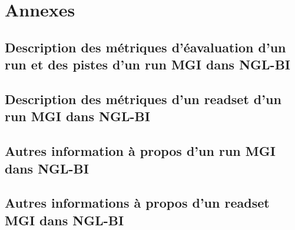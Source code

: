 \section{Annexes}
\subsection{Description des métriques d'éavaluation d'un run et des pistes d'un run MGI dans NGL-BI}

\subsection{Description des métriques d'un readset d'un run MGI dans NGL-BI}

\subsection{Autres information à propos d'un run MGI dans NGL-BI}

\subsection{Autres informations à propos d'un readset MGI dans NGL-BI}